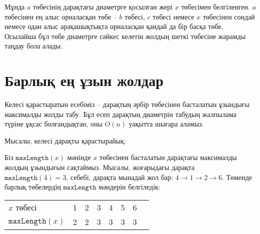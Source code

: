 Мұнда $a$ төбесінің дарақтағы диаметрге қосылған
жері $x$ төбесімен белгіленген. $a$ төбесінен ең 
алыс орналасқан төбе -- $b$ төбесі, $c$ төбесі немесе 
$x$ төбесінен сондай немесе одан алыс арақашықтықта орналасқан қандай да бір басқа төбе.
Осылайша бұл төбе диаметрге сәйкес келетін жолдың 
шеткі төбесіне жарамды таңдау бола алады.

\section{Барлық ең ұзын жолдар}

Келесі қарастыратын есебіміз -- дарақтың әрбір
төбесінен басталатын ұзындығы максималды жолды
табу.
Бұл есеп дарақтың диаметрін табудың жалпылама
түріне ұқсас болғандықтан, оны $O(n)$ уақытта
шығара аламыз.

Мысалы, келесі дарақты қарастырайық:
\begin{center}
\end{center}

Біз $\texttt{maxLength}(x)$ мәнінде $x$ төбесінен
басталатын дарақтағы максималды жолдың ұзындығын
сақтаймыз. Мысалы, жоғарыдағы дарақта $\texttt{maxLength}(4)=3$,
себебі, дарақта мынадай жол бар:
$4 \rightarrow 1 \rightarrow 2 \rightarrow 6$. Төменде
барлық төбелердің $\texttt{maxLength}$ мәндерін белгіледік:
\begin{center}
\begin{tabular}{l|lllllll}
$x$ төбесі  & 1 & 2 & 3 & 4 & 5 & 6 \\
$\texttt{maxLength}(x)$ & 2 & 2 & 3 & 3 & 3 & 3 \\
\end{tabular}
\end{center}


